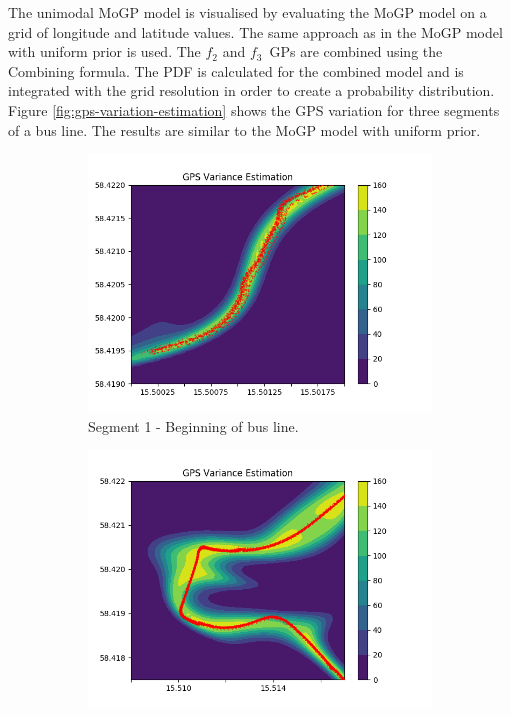 The unimodal MoGP model is visualised by evaluating the MoGP model on a grid of longitude and latitude values.
The same approach as in the MoGP model with uniform prior is used.
The $f_2$ and $f_3$ GPs are combined using the Combining formula.
The PDF is calculated for the combined model and is integrated with the grid resolution in order to create a probability distribution.
Figure \ref{fig:gps-variation-estimation} shows the GPS variation for three segments of a bus line.
The results are similar to the MoGP model with uniform prior.

\begin{figure}
    \centering
    \begin{subfigure}[b]{0.475\textwidth}
        \centering
        \includegraphics[width=\textwidth]{figures/gps_var/f1_ard_contour_segment1_pdf_all}
        \caption[]%
        {{\small Segment 1 - Beginning of bus line.}}    
        \label{fig:contour-segment-1-mixture}
    \end{subfigure}
    \hfill
    \begin{subfigure}[b]{0.475\textwidth}  
        \centering 
        \includegraphics[width=\textwidth]{figures/gps_var/f1_ard_contour_segment2_pdf_all}

\end{subfigure}
\end{figure}
